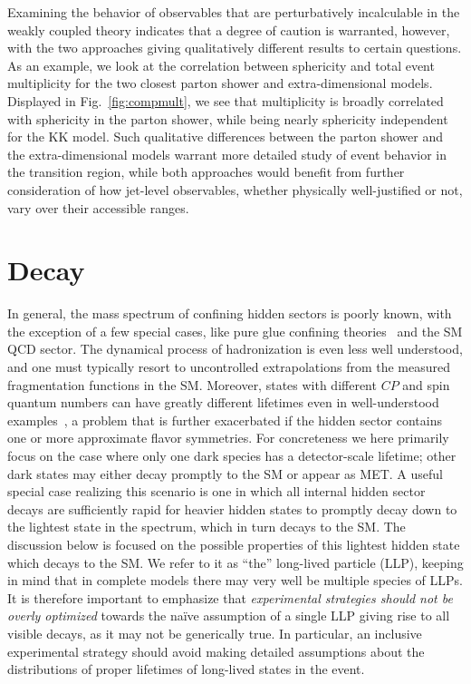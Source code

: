 Examining the behavior of observables that are perturbatively incalculable in the weakly coupled theory indicates that a degree of caution is warranted, however, with the two approaches giving qualitatively different results to certain questions. As an example, we look at the correlation between sphericity and total event multiplicity for the two closest parton shower and extra-dimensional models. Displayed in Fig.~\ref{fig:compmult}, we see that multiplicity is broadly correlated with sphericity in the parton shower, while being nearly sphericity independent for the KK model. Such qualitative differences between the parton shower and the extra-dimensional models warrant more detailed study of event behavior in the transition region, while both approaches would benefit from further consideration of how jet-level observables, whether physically well-justified or not, vary over their accessible ranges.

\section{Decay}
\label{sec:darkshowerdk}

In general, the mass spectrum of confining hidden sectors is poorly known, with the exception of a few special cases, like pure glue confining theories~\cite{Morningstar:1999rf} and the SM QCD sector. The dynamical process of hadronization is even less well understood, and one must typically resort to uncontrolled extrapolations from the measured fragmentation functions in the SM. Moreover,  states with different $CP$ and spin  quantum numbers  can have greatly different lifetimes even in well-understood examples~\cite{Strassler:2006im,Juknevich:2009ji,Juknevich:2009gg}, a problem that is further exacerbated if the hidden sector contains one or more approximate flavor symmetries. For concreteness we here primarily focus on the case where only one dark species has a detector-scale lifetime; other dark states may either decay promptly to the SM or appear as MET.
A useful special case realizing this scenario is one in which all internal hidden sector decays are sufficiently rapid for heavier hidden states to promptly decay down to the lightest state in the spectrum, which in turn decays to the SM. The discussion below is focused on the possible properties of this lightest hidden state which decays to the SM. We refer to it as ``the'' long-lived particle (LLP), keeping in mind that in complete models there may very well be multiple species of LLPs. It is therefore important to emphasize that \emph{experimental strategies should not be overly optimized} towards the na\"ive assumption of a single LLP giving rise to all visible decays, as it may not be generically true. In particular, an inclusive experimental strategy should avoid making detailed assumptions about the distributions of proper lifetimes of long-lived states in the event.

